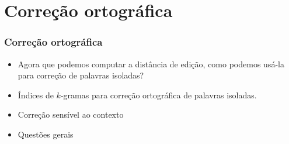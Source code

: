 \documentclass[compress]{beamer}
\begin{document}

\section{Correção ortográfica}

\begin{frame}[<+->]
\frametitle{Correção ortográfica}
\pause[2]
\begin{itemize}
\item Agora que podemos computar a distância de edição, como podemos usá-la 
para correção de palavras isoladas?

\item Índices de $k$-gramas para correção ortográfica de palavras isoladas.
\item Correção sensível ao contexto
\item Questões gerais
\end{itemize}
\end{frame}
\end{document}
